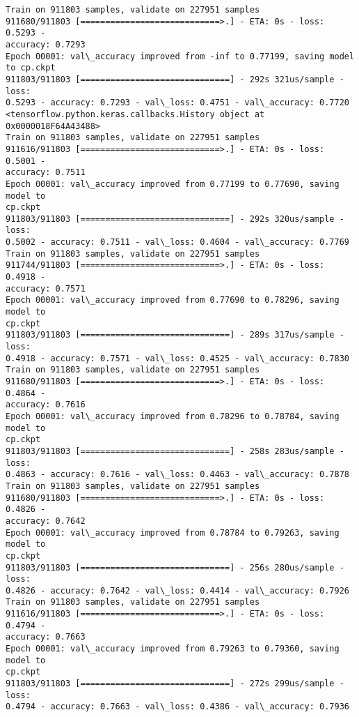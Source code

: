 \documentclass[11pt]{article}
\begin{document}
    \begin{Verbatim}[commandchars=\\\{\}]
Train on 911803 samples, validate on 227951 samples
911680/911803 [============================>.] - ETA: 0s - loss: 0.5293 -
accuracy: 0.7293
Epoch 00001: val\_accuracy improved from -inf to 0.77199, saving model to cp.ckpt
911803/911803 [==============================] - 292s 321us/sample - loss:
0.5293 - accuracy: 0.7293 - val\_loss: 0.4751 - val\_accuracy: 0.7720
<tensorflow.python.keras.callbacks.History object at 0x0000018F64A43488>
Train on 911803 samples, validate on 227951 samples
911616/911803 [============================>.] - ETA: 0s - loss: 0.5001 -
accuracy: 0.7511
Epoch 00001: val\_accuracy improved from 0.77199 to 0.77690, saving model to
cp.ckpt
911803/911803 [==============================] - 292s 320us/sample - loss:
0.5002 - accuracy: 0.7511 - val\_loss: 0.4604 - val\_accuracy: 0.7769
Train on 911803 samples, validate on 227951 samples
911744/911803 [============================>.] - ETA: 0s - loss: 0.4918 -
accuracy: 0.7571
Epoch 00001: val\_accuracy improved from 0.77690 to 0.78296, saving model to
cp.ckpt
911803/911803 [==============================] - 289s 317us/sample - loss:
0.4918 - accuracy: 0.7571 - val\_loss: 0.4525 - val\_accuracy: 0.7830
Train on 911803 samples, validate on 227951 samples
911680/911803 [============================>.] - ETA: 0s - loss: 0.4864 -
accuracy: 0.7616
Epoch 00001: val\_accuracy improved from 0.78296 to 0.78784, saving model to
cp.ckpt
911803/911803 [==============================] - 258s 283us/sample - loss:
0.4863 - accuracy: 0.7616 - val\_loss: 0.4463 - val\_accuracy: 0.7878
Train on 911803 samples, validate on 227951 samples
911680/911803 [============================>.] - ETA: 0s - loss: 0.4826 -
accuracy: 0.7642
Epoch 00001: val\_accuracy improved from 0.78784 to 0.79263, saving model to
cp.ckpt
911803/911803 [==============================] - 256s 280us/sample - loss:
0.4826 - accuracy: 0.7642 - val\_loss: 0.4414 - val\_accuracy: 0.7926
Train on 911803 samples, validate on 227951 samples
911616/911803 [============================>.] - ETA: 0s - loss: 0.4794 -
accuracy: 0.7663
Epoch 00001: val\_accuracy improved from 0.79263 to 0.79360, saving model to
cp.ckpt
911803/911803 [==============================] - 272s 299us/sample - loss:
0.4794 - accuracy: 0.7663 - val\_loss: 0.4386 - val\_accuracy: 0.7936
    \end{Verbatim}
\end{document}
